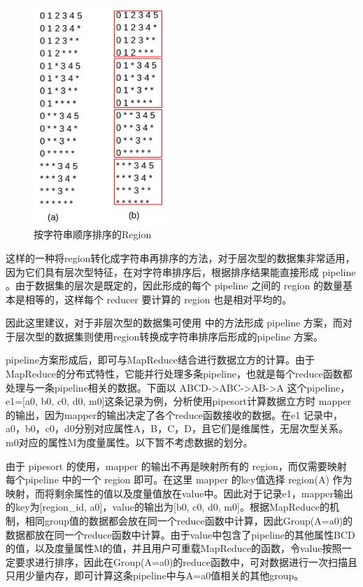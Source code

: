 \begin{figure}[!ht] 
\centering\includegraphics[width=2in]{picture/ch_terasort_mr/sorted_region} 
\caption{按字符串顺序排序的Region}\label{sorted_region} 
\end{figure}

这样的一种将region转化成字符串再排序的方法，对于层次型的数据集非常适用，因为它们具有层次型特征，在对字符串排序后，根据排序结果能直接形成 pipeline 。由于数据集的层次是既定的，因此形成的每个 pipeline 之间的 region 的数量基本是相等的，这样每个 reducer 要计算的 region 也是相对平均的。

因此这里建议，对于非层次型的数据集可使用 \cite{wang2013scalable} 中的方法形成 pipeline 方案，而对于层次型的数据集则使用region转换成字符串排序后形成的pipeline 方案。

pipeline方案形成后，即可与MapReduce结合进行数据立方的计算。由于MapReduce的分布式特性，它能并行处理多条pipeline，也就是每个reduce函数都处理与一条pipeline相关的数据。下面以 ABCD-\textgreater ABC-\textgreater AB-\textgreater A 这个pipeline，e1=[a0, b0, c0, d0, m0]这条记录为例，分析使用pipesort计算数据立方时 mapper 的输出，因为mapper的输出决定了各个reduce函数接收的数据。在e1 记录中，a0，b0，c0，d0分别对应属性A，B，C，D，且它们是维属性，无层次型关系。m0对应的属性M为度量属性。以下暂不考虑数据的划分。

由于 pipesort 的使用，mapper 的输出不再是映射所有的 region，而仅需要映射 每个pipeline 中的一个 region 即可。在这里 mapper 的key值选择 region(A) 作为映射，而将剩余属性的值以及度量值放在value中。因此对于记录e1，mapper输出的key为[region\_id, a0]，value的输出为[b0, c0, d0, m0]。根据MapReduce的机制，相同group值的数据都会放在同一个reduce函数中计算，因此Group(A=a0)的数据都放在同一个reduce函数中计算。由于value中包含了pipeline的其他属性BCD的值，以及度量属性M的值，并且用户可重载MapReduce的函数，令value按照一定要求进行排序，因此在Group(A=a0)的reduce函数中，可对数据进行一次扫描且只用少量内存，即可计算这条pipeline中与A=a0值相关的其他group。

